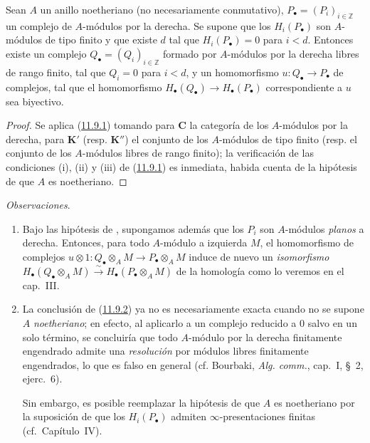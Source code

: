 \begin{corollary}[11.9.2]
\label{0.11.9.2-fr}
Sean $A$ un anillo noetheriano (no necesariamente conmutativo), $P_\bullet=(P_i)_{i\in\mathbb Z}$ un complejo de $A$-módulos por la derecha. Se supone que los $H_i(P_\bullet)$ son $A$-módulos de tipo finito y que existe $d$ tal que $H_i(P_\bullet)=0$ para $i<d$. Entonces existe un complejo $Q_\bullet=(Q_i)_{i\in\mathbb Z}$ formado por $A$-módulos por la derecha libres de rango finito, tal que $Q_i=0$ para $i<d$, y un homomorfismo $u:Q_\bullet\to P_\bullet$ de complejos, tal que el homomorfismo $H_\bullet(Q_\bullet)\to H_\bullet(P_\bullet)$ correspondiente a $u$ sea biyectivo.
\end{corollary}

\begin{proof}
Se aplica (\hyperref[0.11.9.1-fr]{11.9.1}) tomando para $\boldsymbol{C}$ la categoría de los $A$-módulos por la derecha, para $\boldsymbol{K}'$ (resp. $\boldsymbol{K}''$) el conjunto de los $A$-módulos de tipo finito (resp. el conjunto de los $A$-módulos libres de rango finito); la verificación de las condiciones (i), (ii) y (iii) de (\hyperref[0.11.9.1-fr]{11.9.1}) es inmediata, habida cuenta de la hipótesis de que $A$ es noetheriano.
\end{proof}

\begin{env}[11.9.3]
\label{0.11.9.3}
\label{0.11.9.3-fr}
\emph{Observaciones}.
\begin{enumerate}
  \item[{\rm(i)}]
  Bajo las hipótesis de , supongamos además que los
  $P_i$ son $A$-módulos \emph{planos} a derecha.
  Entonces, para todo $A$-módulo a izquierda $M$, el homomorfismo de complejos
  $u\otimes 1:Q_\bullet\otimes_A M\to P_\bullet\otimes_A M$
  induce de nuevo un \emph{isomorfismo}
  $H_\bullet(Q_\bullet\otimes_A M)\xrightarrow{\sim}
H_\bullet(P_\bullet\otimes_A M)$ de la homología como lo veremos en el cap.~III.
\item[{\rm(ii)}] La conclusión de (\hyperref[0.11.9.2-fr]{11.9.2}) ya no es necesariamente exacta cuando no se supone $A$ \emph{noetheriano}; en efecto, al aplicarlo a un complejo reducido a $0$ salvo en un solo término, se concluiría que todo $A$-módulo por la derecha finitamente engendrado admite una \emph{resolución} por
  módulos libres finitamente engendrados, lo que es falso en general
(cf. Bourbaki, \emph{Alg. comm.}, cap.~I, \S~2, ejerc.~6).

  Sin embargo, es posible reemplazar la hipótesis de que $A$ es
  noetheriano por la suposición de que los $H_i(P_\bullet)$ admiten
  $\infty$-presentaciones finitas (cf.\ Capítulo~IV).
\end{enumerate}
\end{env}

